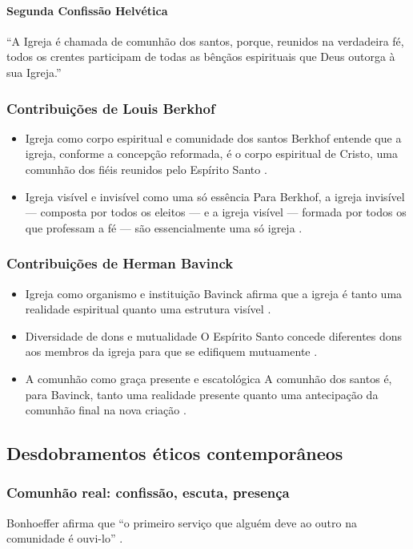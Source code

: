 \paragraph{Segunda Confissão Helvética} 
``A Igreja é chamada de comunhão dos santos, porque, reunidos na verdadeira fé, todos os crentes participam de todas as bênçãos espirituais que Deus outorga à sua Igreja.'' \cite{helvetica}

\subsubsection{Contribuições de Louis Berkhof}
\begin{itemize}
  \item Igreja como corpo espiritual e comunidade dos santos
Berkhof entende que a igreja, conforme a concepção reformada, é o corpo espiritual de Cristo, uma comunhão dos fiéis reunidos pelo Espírito Santo \cite{berkhof2012}.
  \item Igreja visível e invisível como uma só essência
Para Berkhof, a igreja invisível — composta por todos os eleitos — e a igreja visível — formada por todos os que professam a fé — são essencialmente uma só igreja \cite{berkhof2012}.
\end{itemize}

\subsubsection{Contribuições de Herman Bavinck}
\begin{itemize}
  \item Igreja como organismo e instituição
Bavinck afirma que a igreja é tanto uma realidade espiritual quanto uma estrutura visível \cite{bavinck2012}.
  \item Diversidade de dons e mutualidade
O Espírito Santo concede diferentes dons aos membros da igreja para que se edifiquem mutuamente \cite{bavinck2012}.
  \item A comunhão como graça presente e escatológica
A comunhão dos santos é, para Bavinck, tanto uma realidade presente quanto uma antecipação da comunhão final na nova criação \cite{bavinck2012}.
\end{itemize}

\subsection{Desdobramentos éticos contemporâneos}

\subsubsection{Comunhão real: confissão, escuta, presença}
Bonhoeffer afirma que “o primeiro serviço que alguém deve ao outro na comunidade é ouvi-lo” \cite{bonhoeffer2009}.

